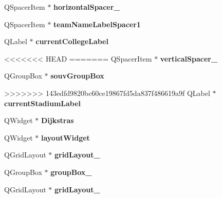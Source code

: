 \begin{DoxyCompactItemize}
Q\+Spacer\+Item $\ast$ {\bfseries horizontal\+Spacer\+\_}
\item 
\mbox{\label{class_ui___main_window_a697188e0e6a25418a16305924598569c}} 
Q\+Spacer\+Item $\ast$ {\bfseries team\+Name\+Label\+Spacer1}
\item 
\mbox{\label{class_ui___main_window_aa9ad62e54884be5f4cb824ea9c9a59ce}} 
Q\+Label $\ast$ {\bfseries current\+College\+Label}
\item 
<<<<<<< HEAD
=======
\mbox{\label{class_ui___main_window_adc1f5fdd97fb3729999c56902d0fa591}} 
Q\+Spacer\+Item $\ast$ {\bfseries vertical\+Spacer\+\_}
\item 
\mbox{\label{class_ui___main_window_a64132a49a31ba12cc065be38a4c5a270}} 
Q\+Group\+Box $\ast$ {\bfseries souv\+Group\+Box}
\item 
>>>>>>> 143edfd9820bc60ce19867fd5da837f486619a9f
\mbox{\label{class_ui___main_window_a91cfb702cfbd2d3e877d10121869534c}} 
Q\+Label $\ast$ {\bfseries current\+Stadium\+Label}
\item 
\mbox{\label{class_ui___main_window_af5cf00b8c4f9d0c2f4899884d07f2bd7}} 
Q\+Widget $\ast$ {\bfseries Dijkstras}
\item 
\mbox{\label{class_ui___main_window_ab96ab0f0578098521fa69a75aa5cdde8}} 
Q\+Widget $\ast$ {\bfseries layout\+Widget}
\item 
\mbox{\label{class_ui___main_window_a20728ed83bf740332bd908ea3e15ace6}} 
Q\+Grid\+Layout $\ast$ {\bfseries grid\+Layout\+\_}
\item 
\mbox{\label{class_ui___main_window_ad8a919e5634add9c41bfc319cb9fd338}} 
Q\+Group\+Box $\ast$ {\bfseries group\+Box\+\_}
\item 
\mbox{\label{class_ui___main_window_a4c2d544352d423a361b8ab2e1d5636ec}} 
Q\+Grid\+Layout $\ast$ {\bfseries grid\+Layout\+\_}
\item 
\mbox{\label{class_ui___main_window_ad31ec710cdca8618307abae590dfd10c}} 

\end{DoxyCompactItemize}
